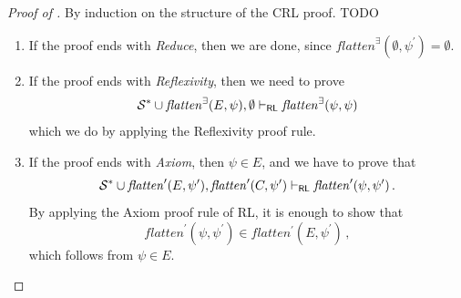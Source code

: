 \begin{proof}[Proof of ]
By induction on the structure of the CRL proof. TODO
\begin{enumerate}
    \item If the proof ends with \emph{Reduce}, then we are done, since $\mathit{flatten}^\exists(\emptyset, \psi^\prime) = \emptyset$.
    
    \item If the proof ends with \emph{Reflexivity}, then we need to prove
    \begin{equation*}
        \mathcal{S}^* \cup \mathit{flatten}^\exists(E, \psi), \emptyset \vdash_{\mathsf{RL}}
          \mathit{flatten}^\exists(\psi, \psi) 
    \end{equation*}
    which we do by applying the Reflexivity proof rule.
    
    \item If the proof ends with \emph{Axiom}, then $\psi \in E$,
          and we have to prove that
          \begin{equation*}
            \mathcal{S}^* \cup \mathit{flatten}^\prime(E, \psi^\prime), \mathit{flatten}^\prime(C, \psi^\prime) \vdash_{\mathsf{RL}}
            \mathit{flatten}^\prime(\psi, \psi^\prime)               \, .
          \end{equation*}
          By applying the Axiom proof rule of RL, it is enough to show that
          \begin{equation*}
              \mathit{flatten}^\prime(\psi, \psi^\prime) \in \mathit{flatten^\prime}(E, \psi^\prime) \, ,
          \end{equation*}
          which follows from $\psi \in E$.
          

\end{enumerate}
\end{proof}
